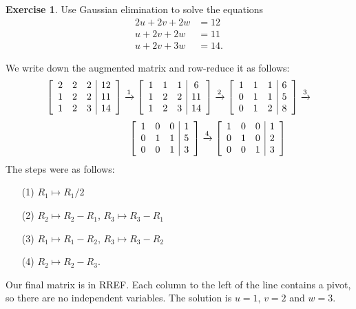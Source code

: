 \documentclass[a4paper]{book}
\theoremstyle{definition}
\newtheorem{exercise}[theorem]{Exercise}
\renewenvironment{solution}{\SolutionInline}{\endSolutionInline}
\begin{document}
\begin{exercise}
 Use Gaussian elimination to solve the equations
 \begin{align*}
  2u + 2v + 2w &= 12 \\
   u + 2v + 2w &= 11 \\
   u + 2v + 3w &= 14.
 \end{align*}
\end{exercise}
\begin{solution}
 We write down the augmented matrix and row-reduce it as follows:
 {\small \[
  \left[\begin{array}{ccc|c}
    2 &  2 &  2 & 12 \\
    1 &  2 &  2 & 11 \\
    1 &  2 &  3 & 14
  \end{array}\right]
  \xrightarrow{1}
  \left[\begin{array}{ccc|c}
    1 &  1 &  1 &  6 \\
    1 &  2 &  2 & 11 \\
    1 &  2 &  3 & 14
  \end{array}\right]
  \xrightarrow{2}
  \left[\begin{array}{ccc|c}
    1 &  1 &  1 &  6 \\
    0 &  1 &  1 &  5 \\
    0 &  1 &  2 &  8
  \end{array}\right]
  \xrightarrow{3}
  \] \[ \hspace{6em}
  \left[\begin{array}{ccc|c}
    1 &  0 &  0 &  1 \\
    0 &  1 &  1 &  5 \\
    0 &  0 &  1 &  3
  \end{array}\right]
  \xrightarrow{4}
  \left[\begin{array}{ccc|c}
    1 &  0 &  0 &  1 \\
    0 &  1 &  0 &  2 \\
    0 &  0 &  1 &  3
  \end{array}\right]
 \]}
 The steps were as follows:
 \begin{itemize}
  \item[(1)] $R_1\mapsto R_1/2$
  \item[(2)] $R_2\mapsto R_2-R_1$, $R_3\mapsto R_3-R_1$
  \item[(3)] $R_1\mapsto R_1-R_2$, $R_3\mapsto R_3-R_2$
  \item[(4)] $R_2\mapsto R_2-R_3$.
 \end{itemize}
 Our final matrix is in RREF.  Each column to the left of the line
 contains a pivot, so there are no independent variables.  The
 solution is $u=1$, $v=2$ and $w=3$.
\end{solution}
\end{document}
